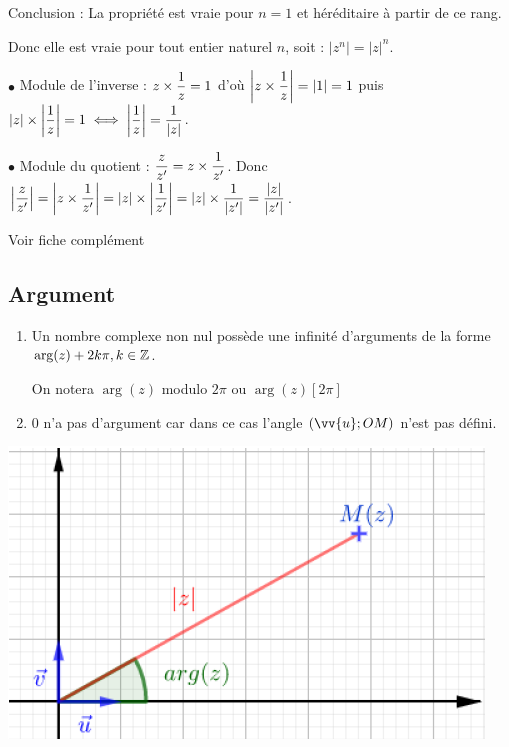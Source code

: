 \documentclass[10pt,a4paper]{article}
\begin{document}
Conclusion : La propriété est vraie pour $n=1$ et héréditaire à partir de ce rang.

Donc elle est vraie pour tout entier naturel $n$, soit : $|z^n|=|z|^n$.

$\bullet$  Module de l'inverse :  $z \times \dfrac{1}{z}=1$ d'où $\left|z \times \dfrac{1}{z} \right|=|1|=1$ puis
$|z| \times \left| \dfrac{1}{z} \right| = 1 \iff \left| \dfrac{1}{z} \right| = \dfrac{1}{|z|}$.


$\bullet$  Module du quotient : $ \dfrac{z}{z'}= z \times \dfrac{1}{z'}$. Donc $\left| \dfrac{z}{z'}\right|=\left|z \times \dfrac{1}{z'} \right|=|z| \times \left| \dfrac{1}{z'} \right| = |z| \times \dfrac{1}{|z'|}= \dfrac{|z|}{|z'|}$.

\medskip


\dem Voir fiche complément

\subsection{Argument}

\begin{minipage}{0.6 \linewidth}

\rems
\begin{enumerate}[$\bullet$]
\item Un nombre complexe non nul possède une infinité d'arguments de la forme $\arg(z) + 2k \pi, k \in \mathbb{Z}$.

On notera $\arg(z)$ modulo $2 \pi$ ou $\arg(z) [2\pi]$

\item 0 n'a pas d'argument car dans ce cas l'angle $(\vv{u};OM)$ n'est pas défini.

\end{enumerate}
\end{minipage}
\begin{minipage}{0.35 \linewidth}
\includegraphics[width = 1 \linewidth]{cplx_arg}
\end{minipage}
\end{document}
